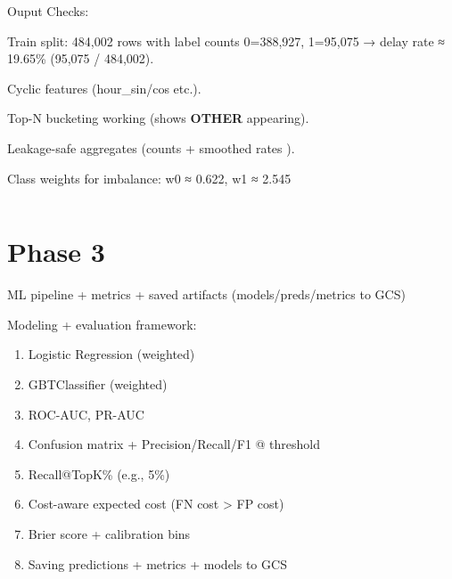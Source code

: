 \documentclass[11pt]{article}
\makeatletter
\newcommand{\boxspacing}{\kern\kvtcb@left@rule\kern\kvtcb@boxsep}
\newcommand{\prompt}[4]{
        {\ttfamily\llap{{\color{#2}[#3]:\hspace{3pt}#4}}\vspace{-\baselineskip}}
    }
\makeatother
\begin{document}
    Ouput Checks:

Train split: 484,002 rows with label counts 0=388,927, 1=95,075 → delay
rate ≈ 19.65\% (95,075 / 484,002).

Cyclic features (hour\_sin/cos etc.).

Top-N bucketing working (shows \textbf{OTHER} appearing).

Leakage-safe aggregates (counts + smoothed rates ).

Class weights for imbalance: w0 ≈ 0.622, w1 ≈ 2.545

    \begin{tcolorbox}[breakable, size=fbox, boxrule=1pt, pad at break*=1mm,colback=cellbackground, colframe=cellborder]
\prompt{In}{incolor}{ }{\boxspacing}
\begin{Verbatim}[commandchars=\\\{\}]

\end{Verbatim}
\end{tcolorbox}

    \section{Phase 3}\label{phase-3}

    ML pipeline + metrics + saved artifacts (models/preds/metrics to GCS)

    Modeling + evaluation framework:

\begin{enumerate}
\def\labelenumi{\arabic{enumi}.}
\item
  Logistic Regression (weighted)
\item
  GBTClassifier (weighted)
\item
  ROC-AUC, PR-AUC
\item
  Confusion matrix + Precision/Recall/F1 @ threshold
\item
  Recall@TopK\% (e.g., 5\%)
\item
  Cost-aware expected cost (FN cost \textgreater{} FP cost)
\item
  Brier score + calibration bins
\item
  Saving predictions + metrics + models to GCS
\end{enumerate}
\end{document}
